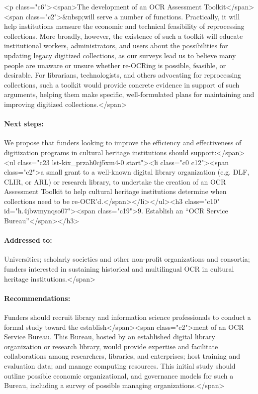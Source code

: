 \documentclass[twoside,11pt]{report}
\begin{document}
<p class="c6"><span>The development of an OCR Assessment Toolkit</span><span class="c2">&nbsp;will serve a number of functions. Practically, it will help institutions measure the economic and technical feasibility of reprocessing collections. More broadly, however, the existence of such a toolkit will educate institutional workers, administrators, and users about the possibilities for updating legacy digitized collections, as our surveys lead us to believe many people are unaware or unsure whether re-OCRing is possible, feasible, or desirable. For librarians, technologists, and others advocating for reprocessing collections, such a toolkit would provide concrete evidence in support of such arguments, helping them make specific, well-formulated plans for maintaining and improving digitized collections.</span>

\paragraph{Next steps:} We propose that funders looking to improve the efficiency and effectiveness of digitization programs in cultural heritage institutions should support:</span><ul class="c23 lst-kix_przah0cj5xm4-0 start"><li class="c0 c12"><span class="c2">a small grant to a well-known digital library organization (e.g. DLF, CLIR, or ARL) or research library, to undertake the creation of an OCR Assessment Toolkit to help cultural heritage institutions determine when collections need to be re-OCR'd.</span></li></ul><h3 class="c10" id="h.4jbwmynqso07"><span class="c19">9. Establish an ``OCR Service Bureau''</span></h3>

\paragraph{Addressed to:} Universities; scholarly societies and other non-profit organizations and consortia; funders interested in sustaining historical and multilingual OCR in cultural heritage institutions.</span>

\paragraph{Recommendations:} Funders should recruit library and information science professionals to conduct a formal study toward the establish</span><span class="c2">ment of an OCR Service Bureau. This Bureau, hosted by an established digital library organization or research library, would provide expertise and facilitate collaborations among researchers, libraries, and enterprises; host training and evaluation data; and manage computing resources. This initial study should outline possible economic organizational, and governance models for such a Bureau, including a survey of possible managing organizations.</span>
\end{document}
